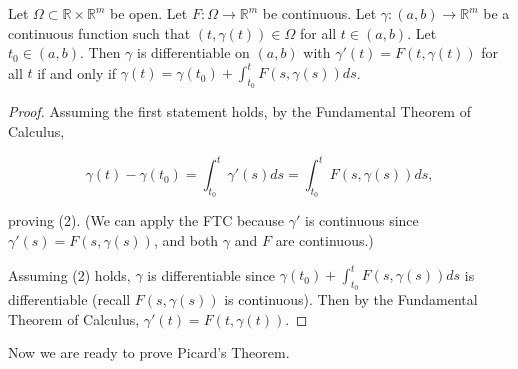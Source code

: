 %
%
%
%

\begin{lemma}\label{ra.lemma.picard.2}

Let \(\Omega \subset \mathbb{R} \times \mathbb{R}^m\) be open. Let \(F: \Omega \to \mathbb{R}^m\) be continuous. Let \(\gamma: (a,b) \to \mathbb{R}^m\) be a continuous function such that \((t,\gamma(t)) \in \Omega\) for all \(t \in (a,b)\). Let \(t_0 \in (a,b)\). Then \(\gamma\) is differentiable on \((a,b)\) with \(\gamma'(t) = F(t, \gamma(t)) \) for all \(t\) if and only if \(\gamma(t) = \gamma(t_0) + \int_{t_0}^t F(s, \gamma(s)) ds\).



\end{lemma}

\begin{proof}

Assuming the first statement holds, by the Fundamental Theorem of Calculus, 

\[
\gamma(t) - \gamma(t_0) = \int_{t_0}^t \gamma'(s) ds = \int_{t_0}^t F(s, \gamma(s)) ds,
\]

proving (2). (We can apply the FTC because \(\gamma'\) is continuous since \(\gamma'(s) = F(s, \gamma(s))\), and both \(\gamma\) and \(F\) are continuous.)

Assuming (2) holds, \(\gamma\) is differentiable since \(\gamma(t_0) + \int_{t_0}^t F(s, \gamma(s)) ds\) is differentiable (recall \(F(s, \gamma(s))\) is continuous). Then by the Fundamental Theorem of Calculus, \(\gamma'(t) = F(t, \gamma(t))\). 

\end{proof}

Now we are ready to prove Picard's Theorem.

